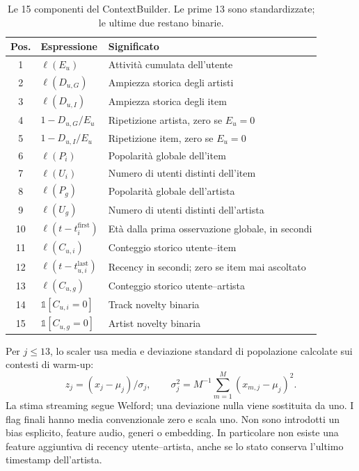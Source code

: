 \begin{table}[H]\centering\small
\begin{tabular}{clp{8.4cm}}
\toprule Pos. & Espressione & Significato\\\midrule
1 & $\ell(E_u)$ & Attività cumulata dell'utente\\
2 & $\ell(D_{u,G})$ & Ampiezza storica degli artisti\\
3 & $\ell(D_{u,I})$ & Ampiezza storica degli item\\
4 & $1-D_{u,G}/E_u$ & Ripetizione artista, zero se $E_u=0$\\
5 & $1-D_{u,I}/E_u$ & Ripetizione item, zero se $E_u=0$\\
6 & $\ell(P_i)$ & Popolarità globale dell'item\\
7 & $\ell(U_i)$ & Numero di utenti distinti dell'item\\
8 & $\ell(P_g)$ & Popolarità globale dell'artista\\
9 & $\ell(U_g)$ & Numero di utenti distinti dell'artista\\
10 & $\ell(t-t_i^{\mathrm{first}})$ & Età dalla prima osservazione globale, in secondi\\
11 & $\ell(C_{u,i})$ & Conteggio storico utente--item\\
12 & $\ell(t-t_{u,i}^{\mathrm{last}})$ & Recency in secondi; zero se item mai ascoltato\\
13 & $\ell(C_{u,g})$ & Conteggio storico utente--artista\\
14 & $\mathbb 1[C_{u,i}=0]$ & Track novelty binaria\\
15 & $\mathbb 1[C_{u,g}=0]$ & Artist novelty binaria\\
\bottomrule
\end{tabular}
\caption{Le 15 componenti del ContextBuilder. Le prime 13 sono standardizzate; le ultime due restano binarie.}\label{tab:features}
\end{table}

Per $j\leq13$, lo scaler usa media e deviazione standard di popolazione calcolate sui contesti di warm-up:
\begin{equation}
z_j=(x_j-\mu_j)/\sigma_j,\qquad
\sigma_j^2=M^{-1}\sum_{m=1}^{M}(x_{m,j}-\mu_j)^2.
\end{equation}
La stima streaming segue Welford; una deviazione nulla viene sostituita da uno. I flag finali hanno media convenzionale zero e scala uno. Non sono introdotti un bias esplicito, feature audio, generi o embedding. In particolare non esiste una feature aggiuntiva di recency utente--artista, anche se lo stato conserva l'ultimo timestamp dell'artista.

